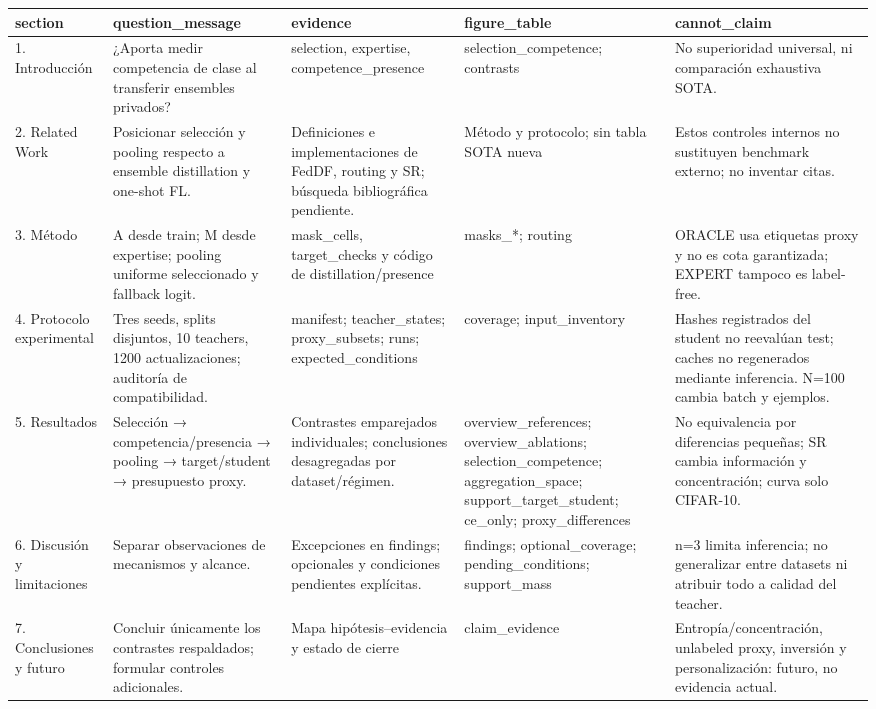 \begin{tabular}{lllll}
\toprule
section & question\_message & evidence & figure\_table & cannot\_claim \\
\midrule
1. Introducción & ¿Aporta medir competencia de clase al transferir ensembles privados? & selection, expertise, competence\_presence & selection\_competence; contrasts & No superioridad universal, ni comparación exhaustiva SOTA. \\
2. Related Work & Posicionar selección y pooling respecto a ensemble distillation y one-shot FL. & Definiciones e implementaciones de FedDF, routing y SR; búsqueda bibliográfica pendiente. & Método y protocolo; sin tabla SOTA nueva & Estos controles internos no sustituyen benchmark externo; no inventar citas. \\
3. Método & A desde train; M desde expertise; pooling uniforme seleccionado y fallback logit. & mask\_cells, target\_checks y código de distillation/presence & masks\_*; routing & ORACLE usa etiquetas proxy y no es cota garantizada; EXPERT tampoco es label-free. \\
4. Protocolo experimental & Tres seeds, splits disjuntos, 10 teachers, 1200 actualizaciones; auditoría de compatibilidad. & manifest; teacher\_states; proxy\_subsets; runs; expected\_conditions & coverage; input\_inventory & Hashes registrados del student no reevalúan test; caches no regenerados mediante inferencia. N=100 cambia batch y ejemplos. \\
5. Resultados & Selección → competencia/presencia → pooling → target/student → presupuesto proxy. & Contrastes emparejados individuales; conclusiones desagregadas por dataset/régimen. & overview\_references; overview\_ablations; selection\_competence; aggregation\_space; support\_target\_student; ce\_only; proxy\_differences & No equivalencia por diferencias pequeñas; SR cambia información y concentración; curva solo CIFAR-10. \\
6. Discusión y limitaciones & Separar observaciones de mecanismos y alcance. & Excepciones en findings; opcionales y condiciones pendientes explícitas. & findings; optional\_coverage; pending\_conditions; support\_mass & n=3 limita inferencia; no generalizar entre datasets ni atribuir todo a calidad del teacher. \\
7. Conclusiones y futuro & Concluir únicamente los contrastes respaldados; formular controles adicionales. & Mapa hipótesis–evidencia y estado de cierre & claim\_evidence & Entropía/concentración, unlabeled proxy, inversión y personalización: futuro, no evidencia actual. \\
\bottomrule
\end{tabular}
